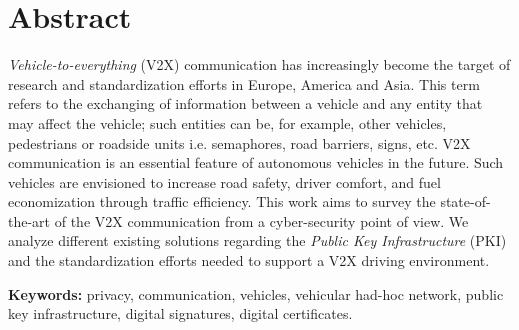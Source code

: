 
\section*{Abstract}


\textit{Vehicle-to-everything} (V2X) communication has increasingly become the target of research and standardization efforts in Europe, America and Asia. This term refers to the exchanging of information between a vehicle and any entity that may affect the vehicle; such entities can be, for example, other vehicles, pedestrians or roadside units  i.e. semaphores, road barriers, signs, etc. V2X communication is an essential feature of autonomous vehicles in the future. Such vehicles are envisioned to increase road safety, driver comfort, and fuel economization through traffic efficiency. This work aims to survey the state-of-the-art of the V2X communication from a cyber-security point of view. We analyze different existing solutions regarding the \textit{Public Key Infrastructure} (PKI) and the standardization efforts needed to support a V2X driving environment.

\vfill

\textbf{\Large Keywords:} privacy, communication, vehicles, vehicular had-hoc network,  public key infrastructure,  digital signatures, digital certificates.

